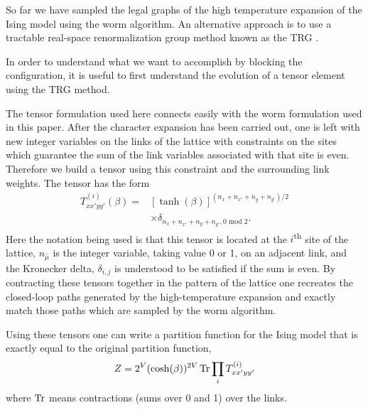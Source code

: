 \documentclass[../main.tex]{subfiles}
\begin{document}
So far we  have sampled the legal graphs of the high temperature expansion of the Ising model using the worm algorithm.
An alternative approach is to use a tractable real-space renormalization group method known as the TRG
\cite{PhysRevB.86.045139,prb87,prd88,prd89,pre89}. 

In order to understand what we want to accomplish by blocking the \lc configuration, it is useful to first understand
the evolution of a tensor element using the TRG method. 

The tensor formulation used here connects easily with  the worm formulation used in this paper.  After the character
expansion has been carried out, one is left with new integer variables on the links of the lattice with constraints on
the sites which guarantee the sum of the link variables associated with that site is even.  Therefore we build a tensor
using this constraint and the surrounding link weights.  The tensor has the form
\begin{align}
    T^{(i)}_{x x' y y'}(\beta) = 
    &\left[\tanh(\beta)\right]^{(n_{x}+n_{x'}+n_{y}+n_{y'})/2}\nonumber \\
    &\times \delta_{n_{x}+n_{x'}+n_{y}+n_{y'}, 0\text{ mod }2}.
\end{align}
Here the notation being used is that this tensor is located at the $i$\textsuperscript{th} site of the lattice,
$n_{\hat{\mu}}$ is the integer variable, taking value 0 or 1, on an adjacent link, and the Kronecker delta,
$\delta_{i,j}$ is understood to be satisfied if the sum is even.  By contracting these tensors together in the pattern
of the lattice one recreates the closed-loop paths generated by the high-temperature expansion and exactly match those
paths which are sampled by the worm algorithm.

Using these tensors one can write a partition function for the Ising model that is exactly equal to the original
partition function,
\begin{equation}
Z =2^V (\cosh (\beta))^{2V}\operatorname{Tr} \prod_{i}T^{(i)}_{xx'yy'} 
\end{equation} 
where $\operatorname{Tr}$ means contractions (sums over 0 and 1) over the links. 
\end{document}
